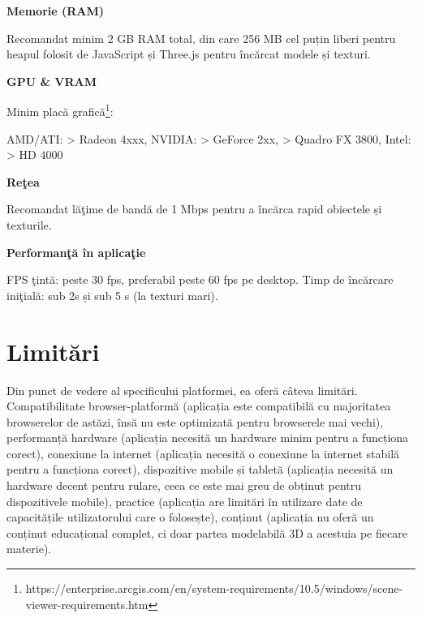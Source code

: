 \textbf{Memorie (RAM)}

Recomandat minim 2 GB RAM total, din care 256 MB cel puțin liberi pentru heapul folosit de JavaScript și 
Three.js pentru încărcat modele și texturi.

\textbf{GPU \& VRAM}

Minim placă grafică\footnote{https://enterprise.arcgis.com/en/system-requirements/10.5/windows/scene-viewer-requirements.htm}: 

AMD/ATI: > Radeon 4xxx, NVIDIA: > GeForce 2xx, > Quadro FX 3800, Intel: > HD 4000 

\textbf{Reţea}

Recomandat lăţime de bandă de 1 Mbps pentru a încărca rapid obiectele și texturile.

\textbf{Performanţă în aplicaţie}

FPS ţintă: peste 30 fps, preferabil peste 60 fps pe desktop.
Timp de încărcare iniţială: sub 2s și sub 5 s (la texturi mari).

\section{Limitări}
\label{sec:proj-limitations}

Din punct de vedere al specificului platformei, ea oferă câteva limitări. Compatibilitate browser-platformă
(aplicația este compatibilă cu majoritatea browserelor de astăzi, însă nu este optimizată pentru browserele mai vechi),
performanță hardware (aplicația necesită un hardware 
minim pentru a funcționa corect), conexiune la internet (aplicația necesită o conexiune 
la internet stabilă pentru a funcționa corect), dispozitive mobile și tabletă (aplicația
necesită un hardware decent pentru rulare, ceea ce este mai greu de obținut pentru dispozitivele
mobile), practice (aplicația are limitări în utilizare date de capacitățile 
utilizatorului care o folosește), conținut (aplicația nu oferă un conținut 
educațional complet, ci doar partea modelabilă 3D a acestuia pe fiecare materie).

